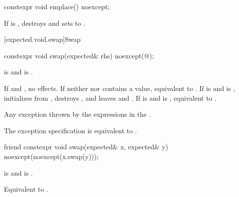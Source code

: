 %
\begin{itemdecl}
constexpr void emplace() noexcept;
\end{itemdecl}

\begin{itemdescr}
\pnum
\effects
If  is , destroys  and sets  to .
\end{itemdescr}

[expected.void.swap]{Swap}

%
\begin{itemdecl}
constexpr void swap(expected& rhs) noexcept(@\seebelow@);
\end{itemdecl}

\begin{itemdescr}
\pnum
\constraints
{} is  and  is .

\pnum
\effects
If  and , no effects. If neither  nor  contains a value, equivalent to . If  is  and  is , initializes  from , destroys , and leaves   and  . If  is  and  is , equivalent to .

\pnum
\throws
Any exception thrown by the expressions in the .

\pnum
\remarks
The exception specification is equivalent to .
\end{itemdescr}

%
\begin{itemdecl}
friend constexpr void swap(expected& x, expected& y) noexcept(noexcept(x.swap(y)));
\end{itemdecl}

\begin{itemdescr}
\pnum
\constraints
{} is  and  is .

\pnum
\effects
Equivalent to .
\end{itemdescr}


